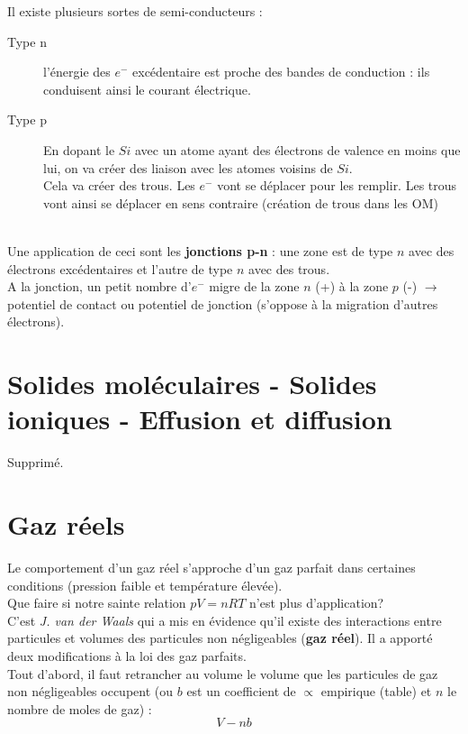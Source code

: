 \documentclass[british,french,11pt, a4paper, openany]{book}
\begin{document}
	Il existe plusieurs sortes de semi-conducteurs : 
	\begin{description}
		\item[Type n] l'énergie des $e^-$ excédentaire est proche des bandes de conduction : ils conduisent ainsi le courant électrique.
		\item[Type p] En dopant le $Si$ avec un atome ayant des électrons de valence en moins que lui, on va créer des liaison avec les atomes voisins de $Si$.\\
		Cela va créer des trous. Les $e^-$ vont se déplacer pour les remplir. Les trous vont ainsi se déplacer en sens contraire (création de trous dans les OM)
	\end{description}
	\ \\
	
	Une application de ceci sont les \textbf{jonctions p-n} : une zone est de type $n$ avec des électrons excédentaires et l'autre de type $n$ avec des trous.\\
	A la jonction, un petit nombre d'$e^-$ migre de la zone $n$ (+) à la zone $p$ (-) $\rightarrow$ potentiel de contact ou potentiel de jonction (s'oppose à la migration d'autres électrons).
	
	
	
	\section{Solides moléculaires - Solides ioniques - Effusion et diffusion}
	Supprimé.
	
	\section{Gaz réels}
	Le comportement d'un gaz réel s'approche d'un gaz parfait dans certaines conditions (pression faible et température élevée).\\
	Que faire si notre sainte relation $pV = nRT$ n'est plus d'application? \\
	
	C'est \textit{J. van der Waals} qui a mis en évidence qu'il existe des interactions entre particules et volumes des particules non négligeables (\textbf{gaz réel}). Il a apporté deux modifications à la loi des gaz parfaits.\\
	
	Tout d'abord, il faut retrancher au volume le volume que les particules de gaz non négligeables occupent (ou $b$ est un coefficient de $\propto$ empirique (table) et $n$ le nombre de moles de gaz) :
	$$V - nb$$
	
\end{document}
